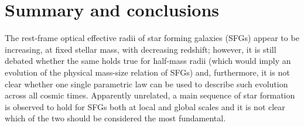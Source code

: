 \documentclass[fleqn,usenatbib]{mnras}
\begin{document}

\section[Summary and conclusions]{Summary and conclusions}\label{sec:Summary}

The rest-frame optical effective radii of star forming galaxies (SFGs) appear to be increasing, at fixed stellar mass, with decreasing redshift; however, it is still debated whether the same holds true for half-mass radii (which would imply an evolution of the physical mass-size relation of SFGs) and, furthermore, it is not clear whether one single parametric law can be used to describe such evolution across all cosmic times. Apparently unrelated, a main sequence of star formation is observed to hold for SFGs both at local and global scales and it is not clear which of the two should be considered the most fundamental. 
\end{document}

